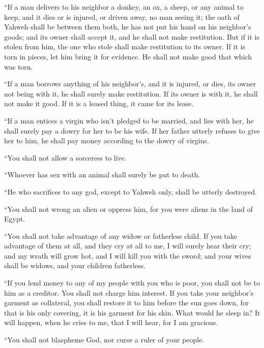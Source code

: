  ``If a man delivers to his neighbor a donkey, an ox, a
sheep, or any animal to keep, and it dies or is injured, or driven away,
no man seeing it;  the oath of Yahweh shall be between them
both, he has not put his hand on his neighbor's goods; and its owner
shall accept it, and he shall not make restitution.  But if
it is stolen from him, the one who stole shall make restitution to its
owner.  If it is torn in pieces, let him bring it for
evidence. He shall not make good that which was torn.

 ``If a man borrows anything of his neighbor's, and it is
injured, or dies, its owner not being with it, he shall surely make
restitution.  If its owner is with it, he shall not make it
good. If it is a leased thing, it came for its lease.

 ``If a man entices a virgin who isn't pledged to be
married, and lies with her, he shall surely pay a dowry for her to be
his wife.  If her father utterly refuses to give her to
him, he shall pay money according to the dowry of virgins.

 ``You shall not allow a sorceress to live.

 ``Whoever has sex with an animal shall surely be put to
death.

 ``He who sacrifices to any god, except to Yahweh only,
shall be utterly destroyed.

 ``You shall not wrong an alien or oppress him, for you
were aliens in the land of Egypt.

 ``You shall not take advantage of any widow or fatherless
child.  If you take advantage of them at all, and they cry
at all to me, I will surely hear their cry;  and my wrath
will grow hot, and I will kill you with the sword; and your wives shall
be widows, and your children fatherless.

 ``If you lend money to any of my people with you who is
poor, you shall not be to him as a creditor. You shall not charge him
interest.  If you take your neighbor's garment as
collateral, you shall restore it to him before the sun goes down,
 for that is his only covering, it is his garment for his
skin. What would he sleep in? It will happen, when he cries to me, that
I will hear, for I am gracious.

 ``You shall not blaspheme God, nor curse a ruler of your
people.

